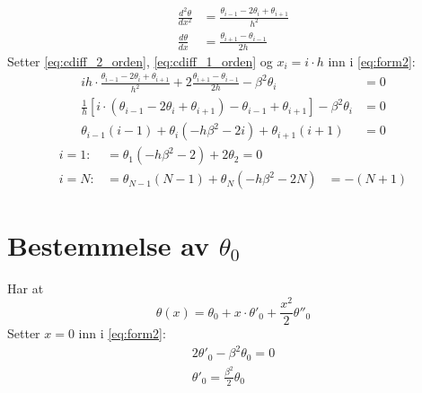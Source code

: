 \begin{subequations}
\begin{align}
  \frac{d^2 \theta}{dx^2} &= \frac{\theta_{i-1} - 2\theta_i + \theta_{i+1}}{h^2} \label{eq:cdiff_2_orden} \\
  \frac{d\theta}{dx} &= \frac{\theta_{i+1} - \theta_{i-1}}{2h} \label{eq:cdiff_1_orden}
\end{align}
\end{subequations}
Setter \eqref{eq:cdiff_2_orden}, \eqref{eq:cdiff_1_orden} og $x_i=i\cdot h$ inn i \eqref{eq:form2}:
\begin{align}
  ih \cdot \frac{\theta_{i-1} - 2\theta_i + \theta_{i+1}}{h^2} + 2 \frac{\theta_{i+1} - \theta_{i-1}}{2h} - \beta^2 \theta_i &= 0 \nonumber \\
  \frac{1}{h} \left[ i \cdot \left( \theta_{i-1} - 2\theta_i + \theta_{i+1} \right) - \theta_{i-1} + \theta_{i+1} \right] - \beta^2 \theta_i &= 0 \nonumber \\
  \theta_{i-1} (i-1) + \theta_i (-h\beta^2-2i) + \theta_{i+1} (i+1) &= 0 \nonumber
\end{align}
\begin{align}
  i=1: &= \theta_1 (-h\beta^2-2) + 2\theta_{2} = 0 \\
  i=N: &= \theta_{N-1} (N-1) + \theta_N (-h\beta^2-2N) &= -(N+1)
\end{align}






\section{Bestemmelse av $\theta_0$} %
\label{sec:bestemmelse_av_theta_0_}
Har at
\begin{equation}
  \theta(x) = \theta_0 + x\cdot \theta'_0 + \frac{x^2}{2}\theta''_0 \label{eq:rekkeutv}
\end{equation}
Setter $x=0$ inn i \eqref{eq:form2}:
\begin{align}
  2\theta'_0 - \beta^2\theta_0 = 0 \nonumber \\
  \theta'_0 = \frac{\beta^2}{2}\theta_0 \label{eq:dtheta0}
\end{align}


